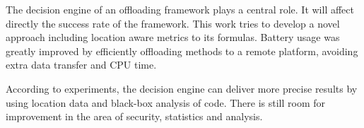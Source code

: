 \documentclass[10pt, conference, letterpaper]{IEEEtran}
\begin{document}
  The decision engine of an offloading framework plays a central role. It will affect directly the success rate of the framework. This work tries to develop a novel approach including location aware metrics to its formulas. Battery usage was greatly improved by efficiently offloading methods to a remote platform, avoiding extra data transfer and CPU time.

  According to experiments, the decision engine can deliver more precise results by using location data and black-box analysis of code. There is still room for improvement in the area of security, statistics and analysis.





\end{document}
